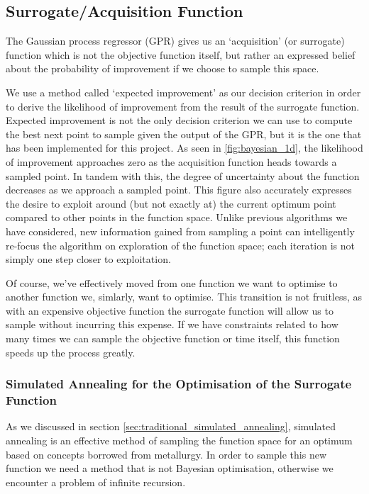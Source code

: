	\subsection{Surrogate/Acquisition Function}
		\label{sec:bayesian_surrogate}
		The Gaussian process regressor (GPR) gives us an `acquisition' (or surrogate) function which is not the objective function itself, but rather an expressed belief about the probability of improvement if we choose to sample this space.

		We use a method called `expected improvement' as our decision criterion in order to derive the likelihood of improvement from the result of the surrogate function. Expected improvement is not the only decision criterion we can use to compute the best next point to sample given the output of the GPR, but it is the one that has been implemented for this project. As seen in \ref{fig:bayesian_1d}, the likelihood of improvement approaches zero as the acquisition function heads towards a sampled point. In tandem with this, the degree of uncertainty about the function decreases as we approach a sampled point. This figure also accurately expresses the desire to exploit around (but not exactly at) the current optimum point compared to other points in the function space. Unlike previous algorithms we have considered, new information gained from sampling a point can intelligently re-focus the algorithm on exploration of the function space; each iteration is not simply one step closer to exploitation.

		Of course, we've effectively moved from one function we want to optimise to another function we, simlarly, want to optimise. This transition is not fruitless, as with an expensive objective function the surrogate function will allow us to sample without incurring this expense. If we have constraints related to how many times we can sample the objective function or time itself, this function speeds up the process greatly.

	\subsubsection{Simulated Annealing for the Optimisation of the Surrogate Function}  
		\label{sec:bayesian_annealing}
		As we discussed in section \ref{sec:traditional_simulated_annealing}, simulated annealing is an effective method of sampling the function space for an optimum based on concepts borrowed from metallurgy. In order to sample this new function we need a method that is not Bayesian optimisation, otherwise we encounter a problem of infinite recursion.

